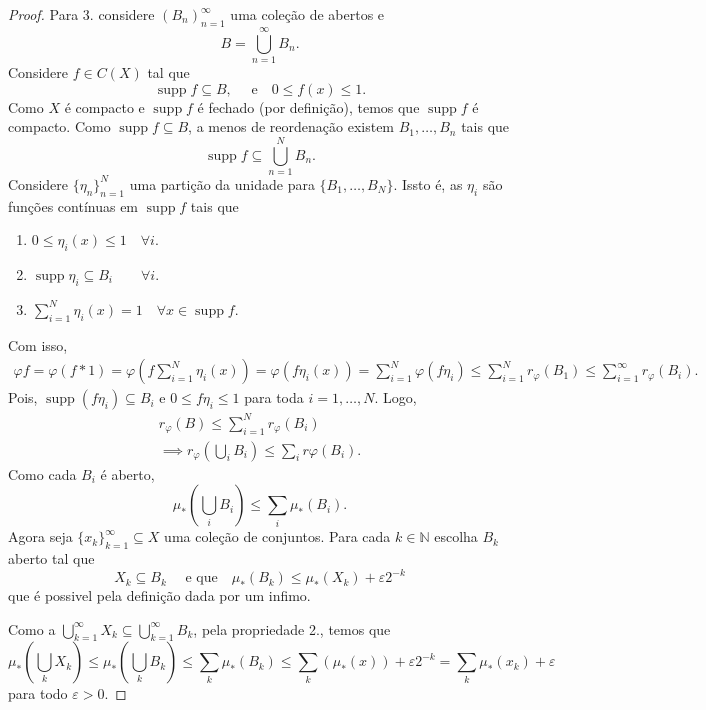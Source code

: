 \documentclass[portuguese]{article}
\theoremstyle{definition}
\newcommand{\N}{\mathbb{N}}
\begin{document}
\begin{proof}
	Para 3. considere $(B_n)_{n=1}^\infty$ uma coleção de abertos e
	\[B=\bigcup_{n=1}^\infty B_n.\]
	Considere $f\in C(X)$ tal que
	\[\operatorname{supp}f\subseteq B,\quad\text{ e}\quad 0\leq f(x)\leq 1.\]
	Como $X$ é compacto e $\operatorname{supp}f$ é fechado (por definição), temos que $\operatorname{supp}f$ é compacto. Como $\operatorname{supp}f\subseteq B$, a menos de reordenação existem $B_1,\ldots,B_n$ tais que
	\[\operatorname{supp}f\subseteq \bigcup_{n=1}^NB_n.\]
	Considere $\{\eta_n\}_{n=1}^N$ uma partição da unidade para $\{B_1,\ldots,B_N\}$. Issto é, as $\eta_i$ são funções contínuas em $\operatorname{supp}f$ tais que
	\begin{enumerate}
		\item $0\leq\eta_i(x)\leq1\quad\forall i$.
		\item $\operatorname{supp}\eta_i\subseteq B_i\qquad\forall i$.
		\item $\sum_{i=1}^N\eta_i(x)=1\quad\forall x\in \operatorname{supp}f$.
	\end{enumerate}
	Com isso,
	\begin{align*}
		\varphi f=\varphi(f*1)=\varphi\left(f\sum_{i=1}^N\eta_i(x)\right)=\varphi\left(f\eta_i(x)\right)=\sum_{i=1}^N\varphi(f\eta_i)\leq\sum_{i=1}^Nr_\varphi(B_1)\leq\sum_{i=1}^\infty r_\varphi(B_i).
	\end{align*}
	Pois, $\operatorname{supp}(f\eta_i)\subseteq B_i$ e $0\leq f\eta_i\leq1$ para toda $i=1,\ldots,N$. Logo,
	\begin{align*}
		r_\varphi(B)\leq\sum_{i=1}^Nr_\varphi(B_i)\\
		\implies r_\varphi\left(\bigcup_i B_i\right)\leq\sum_i r\varphi(B_i).
	\end{align*}
	Como cada $B_i$ é aberto,
	\[\mu_*\left(\bigcup_iB_i\right)\leq\sum_i\mu_*(B_i).\]
	Agora seja $\{x_k\}_{k=1}^\infty\subseteq X$ uma coleção de conjuntos. Para cada $k\in\N$ escolha $B_k$ aberto tal que
	\[X_k\subseteq B_k\quad\text{ e que}\quad\mu_*(B_k)\leq\mu_*(X_k)+\varepsilon2^{-k}\]
	que é possivel pela definição dada por um infimo.
	
	Como a $\bigcup_{k=1}^\infty X_k\subseteq\bigcup_{k=1}^\infty B_k$, pela propriedade 2., temos que
	\[\mu_*\left(\bigcup_kX_k\right)\leq\mu_*\left(\bigcup_kB_k\right)\leq\sum_k\mu_*(B_k)\leq\sum_k(\mu_*(x))+\varepsilon2^{-k}=\sum_k\mu_*(x_k)+\varepsilon\]
	para todo $\varepsilon>0$.
	

\end{proof}
\end{document}
